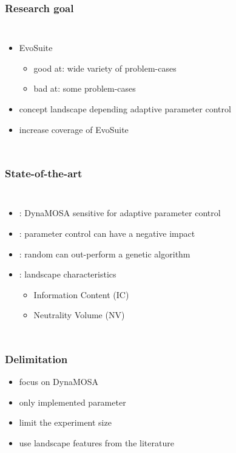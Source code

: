 \begin{frame}
	\frametitle{Research goal}
	
	\begin{columns}[c]
		
		\column{\textwidth}
		\begin{itemize}
			\item EvoSuite
			\begin{itemize}
				\item good at: wide variety of problem-cases
				\item bad at: some problem-cases
		\end{itemize}
			\item concept landscape depending adaptive parameter control
			\item increase coverage of EvoSuite
		\end{itemize}
		
	\end{columns}
	
\end{frame}

\begin{frame}
	\frametitle{State-of-the-art}
	
	\begin{columns}[c]
		
		\column{\textwidth}
		\begin{itemize}
			\item \cite{Wetzler.2020}: DynaMOSA sensitive for adaptive parameter control
			\item \cite{Paterson.2015}: parameter control can have a negative impact
			\item \cite{Shamshiri.2015}: random can out-perform a genetic algorithm
			\item \cite{Albunian.2020}: landscape characteristics 
			\begin{itemize}
				\item Information Content (IC)
				\item Neutrality Volume (NV)
			\end{itemize}
		\end{itemize}
		
	\end{columns}
	
\end{frame}

\begin{frame}
	\frametitle{Delimitation}
	
	\begin{itemize}
		\item focus on DynaMOSA
		\item only implemented parameter
		\item limit the experiment size
		\item use landscape features from the literature
	\end{itemize}
	
\end{frame}

